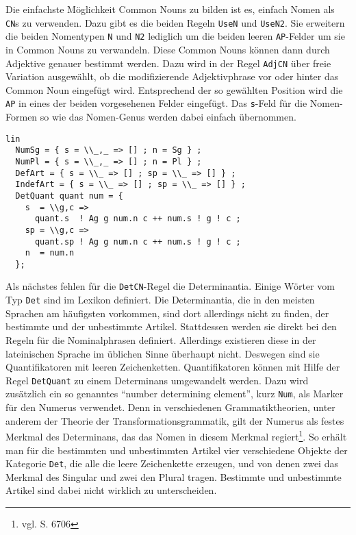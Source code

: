 Die einfachste Möglichkeit Common Nouns zu bilden ist es, einfach Nomen als \texttt{CN}s zu verwenden. Dazu gibt es die beiden Regeln \texttt{UseN} und \texttt{UseN2}. Sie erweitern die beiden Nomentypen \texttt{N} und \texttt{N2} lediglich um die beiden leeren \texttt{AP}-Felder um sie in Common Nouns zu verwandeln. Diese Common Nouns können dann durch Adjektive genauer bestimmt werden. Dazu wird in der Regel \texttt{AdjCN} über freie Variation ausgewählt, ob die modifizierende Adjektivphrase vor oder hinter das Common Noun eingefügt wird. Entsprechend der so gewählten Position wird die \texttt{AP} in eines der beiden vorgesehenen Felder eingefügt. Das \texttt{s}-Feld für die Nomen-Formen so wie das Nomen-Genus werden dabei einfach übernommen. \par
\begin{lstlisting}[float=h!tp,caption={Die Syntaxregeln \texttt{DetQuant} um aus einem Number Determining Element und einem Quantifikator ein \texttt{Det} zu erzeugen (vgl. \textbf{NounLat.gf}},label={GF-Noun-DetQuant}]
lin
  NumSg = { s = \\_,_ => [] ; n = Sg } ;
  NumPl = { s = \\_,_ => [] ; n = Pl } ;
  DefArt = { s = \\_ => [] ; sp = \\_ => [] } ;
  IndefArt = { s = \\_ => [] ; sp = \\_ => [] } ;
  DetQuant quant num = {
    s  = \\g,c => 
      quant.s  ! Ag g num.n c ++ num.s ! g ! c ;
    sp = \\g,c => 
      quant.sp ! Ag g num.n c ++ num.s ! g ! c ;
    n  = num.n
  };
\end{lstlisting}
Als nächstes fehlen für die \texttt{DetCN}-Regel die Determinantia. Einige Wörter vom Typ \texttt{Det} sind im Lexikon definiert. Die Determinantia, die in den meisten Sprachen am häufigsten vorkommen, sind dort allerdings nicht zu finden, der bestimmte und der unbestimmte Artikel. Stattdessen werden sie direkt bei den Regeln für die Nominalphrasen definiert. Allerdings existieren diese in der lateinischen Sprache im üblichen Sinne überhaupt nicht. Deswegen sind sie Quantifikatoren mit leeren Zeichenketten. Quantifikatoren können mit Hilfe der Regel \texttt{DetQuant} zu einem Determinans umgewandelt werden. Dazu wird zusätzlich ein so genanntes "`number determining element"', kurz \texttt{Num}, als Marker für den Numerus verwendet. Denn in verschiedenen Grammatiktheorien, unter anderem der Theorie der Transformationsgrammatik, gilt der Numerus als festes Merkmal des Determinans, das das Nomen in diesem Merkmal regiert\footnote{vgl. \cite{METZLER2004} S. 6706}. So erhält man für die bestimmten und unbestimmten Artikel vier verschiedene Objekte der Kategorie \texttt{Det}, die alle die leere Zeichenkette erzeugen, und von denen zwei das Merkmal des Singular und zwei den Plural tragen. Bestimmte und unbestimmte Artikel sind dabei nicht wirklich zu unterscheiden. \par
